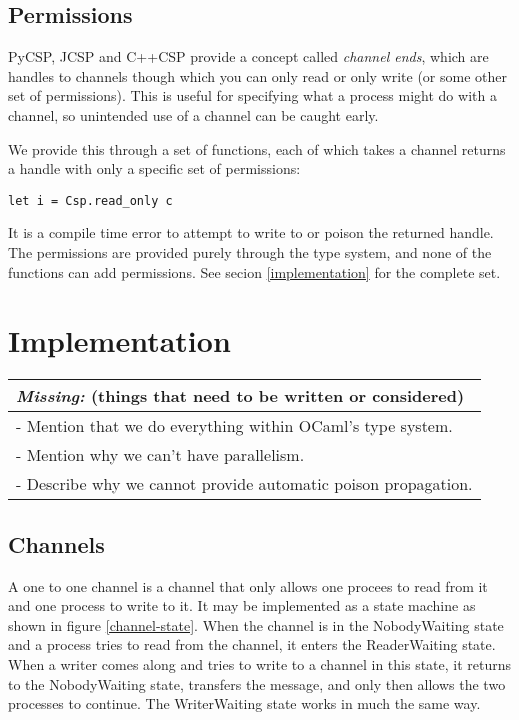 \documentclass[a4paper,12pt]{article}
\newcommand{\missing}[1]{
  \begin{tabular}{|p{11cm}|}
    \hline
    \emph{Missing:} {\scriptsize (things that need to be written or considered)} \\
    \hline
    #1
    \hline
  \end{tabular}
}
\begin{document}
\subsection{Permissions}

PyCSP, JCSP and C++CSP provide a concept called \emph{channel ends}, which are handles to channels
though which you can only read or only write (or some other set of permissions). This is useful for
specifying what a process might do with a channel, so unintended use of a channel can be caught
early.

We provide this through a set of functions, each of which takes a channel returns a handle with only
a specific set of permissions:

\begin{verbatim}
let i = Csp.read_only c
\end{verbatim}

It is a compile time error to attempt to write to or poison the returned handle. The permissions are 
provided purely through the type system, and none of the functions can add permissions. 
See secion \ref{implementation} for the complete set.

\section{Implementation}
\missing{
- Mention that we do everything within OCaml's type system.\\
- Mention why we can't have parallelism.\\
- Describe why we cannot provide automatic poison propagation.\\
}
\label{implementation}


\subsection{Channels}
A one to one channel is a channel that only allows one procees to read from it and one process 
to write to it. It may be implemented as a state machine as shown in figure \ref{channel-state}.
When the channel is in the NobodyWaiting state and a process tries to read from the channel,
it enters the ReaderWaiting state. When a writer comes along and tries to write to a channel
in this state, it returns to the NobodyWaiting state, transfers the message, and only then
allows the two processes to continue. The WriterWaiting state works in much the same way.
\end{document}
